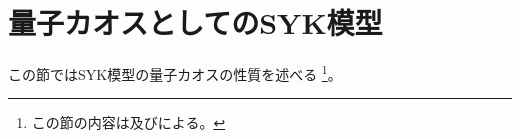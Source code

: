 \section{量子カオスとしてのSYK模型}
この節ではSYK模型の量子カオスの性質を述べる
\footnote{この節の内容は\cite{polchinski_chaos}及び\cite{stanford_chaos}による。}。

\pagebreak